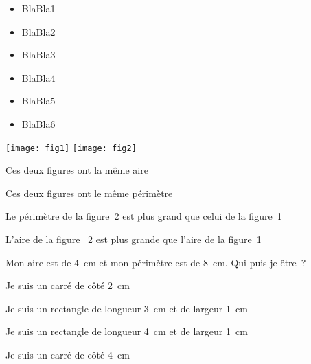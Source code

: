 \begin{acquis}
\begin{itemize}
\item BlaBla1
\item BlaBla2
\item BlaBla3
\item BlaBla4
\item BlaBla5
\item BlaBla6
\end{itemize}
\end{acquis}


\begin{QCM}
  \begin{GroupeQCM}
    \begin{exercice}
    
      \texttt{[image: fig1]} \texttt{[image: fig2]} 
      \begin{ChoixQCM}{4}
      \item Ces deux figures ont la même aire
      \item Ces deux figures ont le même périmètre
      \item Le périmètre de la figure 2 est plus grand que celui de la figure 1
      \item L'aire de la figure  2 est plus grande que l'aire de la figure 1
      \end{ChoixQCM}
\begin{corrige}
   \end{corrige}
    \end{exercice}


    \begin{exercice}
      Mon aire est de 4 cm et mon périmètre est de 8 cm. Qui puis‑je être ?
      \begin{ChoixQCM}{4}
      \item Je suis un carré de côté 2 cm
      \item Je suis un rectangle de longueur 3 cm et de largeur 1 cm
      \item Je suis un rectangle de longueur 4 cm et de largeur 1 cm
      \item Je suis un carré de côté 4 cm
      \end{ChoixQCM}
\begin{corrige}
   \end{corrige}
    \end{exercice}
    

\end{GroupeQCM}
\end{QCM}
